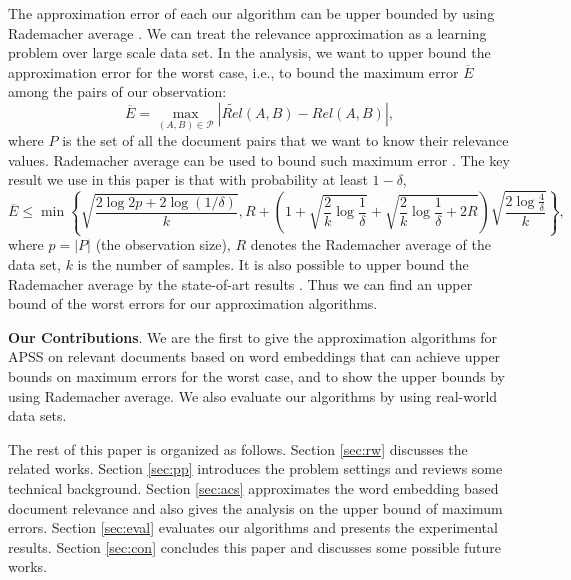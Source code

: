 \documentclass{article}
\begin{document}
The approximation error of each our algorithm can be upper bounded by using Rademacher average \cite{BM02,Mohri09,BBM05}. We can treat the relevance approximation as a learning problem over large scale data set. In the analysis, we want to upper bound the approximation error for the worst case, i.e., to bound the maximum error $\overline{E}$ among the pairs of our observation:
$$\overline{E} = \max_{(A,B)\in \mathcal{P}} |\widetilde{Rel}(A,B) - Rel(A,B)|,$$
where $P$ is the set of all the document pairs that we want to know their relevance values. 
Rademacher average can be used to bound such maximum error \cite{RU15,RU16}. The key result we use in this paper is that with probability at least $1-\delta$,
$$\overline{E} \leq \min\left\{\sqrt{\frac{2\log 2p + 2\log(1/\delta)}{k}}, R + \left(1+\sqrt{\frac{2}{k}\log \frac{1}{\delta}} + \sqrt{\frac{2}{k}\log \frac{1}{\delta} + 2R}\right)\sqrt{\frac{2\log \frac{4}{\delta}}{k}}\right\},$$
where $p=|P|$ (the observation size), $R$ denotes the Rademacher average of the data set, $k$ is the number of samples. 
It is also possible to upper bound the Rademacher average by the state-of-art results \cite{AGO14,RU15,RU16}. Thus we can find an upper bound of the worst errors for our approximation algorithms.

{\color{black}
\textbf{Our Contributions}. We are the first to give the approximation algorithms for APSS on relevant documents based on word embeddings that can achieve upper bounds on maximum errors for the worst case, and to show the upper bounds by using Rademacher average. We also evaluate our algorithms by using real-world data sets.
}

The rest of this paper is organized as follows. Section \ref{sec:rw} discusses the related works. Section \ref{sec:pp} introduces the problem settings and reviews some technical background. Section \ref{sec:acs} approximates the word embedding based document relevance and also gives the analysis on the upper bound of maximum errors. Section \ref{sec:eval} evaluates our algorithms and presents the experimental results. Section \ref{sec:con} concludes this paper and discusses some possible future works.
\end{document}
